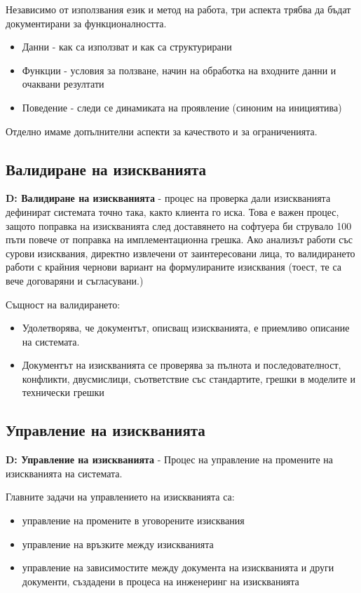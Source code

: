\documentclass[fleqn,12pt]{article}
\begin{document}
Независимо от използвания език и метод на работа, три аспекта трябва да бъдат документирани за функционалността.
\begin{itemize}
	\item Данни - как са използват и как са структурирани
	\item Функции - условия за ползване, начин на обработка на входните данни и очаквани резултати
	\item Поведение - следи се динамиката на проявление (синоним на инициятива)
\end{itemize}

Отделно имаме допълнителни аспекти за качеството и за ограниченията.

\subsection{Валидиране на изискванията}
\textbf{D: Валидиране на изискванията} - процес на проверка дали изискванията дефинират системата точно така, както клиента го иска. Това е важен процес, защото поправка на изискванията след доставянето на софтуера би струвало 100 пъти повече от поправка на имплементационна грешка.
\bigbreak
Ако анализът работи със сурови изисквания, директно извлечени от заинтересовани лица, то валидирането работи с крайния чернови вариант на формулираните изисквания (тоест, те са вече договаряни и съгласувани.)

Същност на валидирането:
\begin{itemize}
	\item Удолетворява, че документът, описващ изискванията, е приемливо описание на системата.
	\item Документът на изискванията се проверява за пълнота и последователност, конфликти, двусмислици, съответствие със стандартите, грешки в моделите и технически грешки
\end{itemize}

\subsection{Управление на изискванията}
\textbf{D: Управление на изискванията} - Процес на управление на промените на изискванията на системата.

Главните задачи на управлението на изискванията са:
\begin{itemize}
	\item управление на промените в уговорените изисквания
	\item управление на връзките между изискванията
	\item управление на зависимостите между документа на изискванията и други документи, създадени в процеса на инженеринг на изискванията
\end{itemize}
\end{document}
